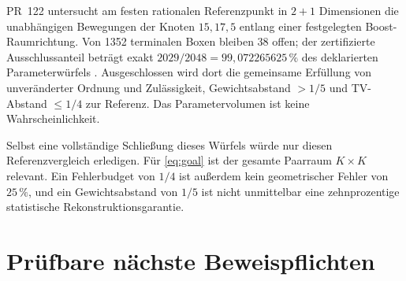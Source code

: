 \documentclass[11pt,a4paper]{article}
\theoremstyle{definition}\newtheorem{definition}{Definition}
\theoremstyle{remark}\newtheorem*{remark}{Bemerkung}
\begin{document}
PR~122 untersucht am festen rationalen Referenzpunkt in $2+1$ Dimensionen die unabhängigen Bewegungen der Knoten $15,17,5$ entlang einer festgelegten Boost-Raumrichtung. Von 1352 terminalen Boxen bleiben 38 offen; der zertifizierte Ausschlussanteil beträgt exakt $2029/2048=99{,}072265625\,\%$ des deklarierten Parameterwürfels \cite{repo122}. Ausgeschlossen wird dort die gemeinsame Erfüllung von unveränderter Ordnung und Zulässigkeit, Gewichtsabstand $>1/5$ und TV-Abstand $\leq1/4$ zur Referenz. Das Parametervolumen ist keine Wahrscheinlichkeit.

Selbst eine vollständige Schließung dieses Würfels würde nur diesen Referenzvergleich erledigen. Für \eqref{eq:goal} ist der gesamte Paarraum $K\times K$ relevant. Ein Fehlerbudget von $1/4$ ist außerdem kein geometrischer Fehler von $25\,\%$, und ein Gewichtsabstand von $1/5$ ist nicht unmittelbar eine zehnprozentige statistische Rekonstruktionsgarantie.

\section{Prüfbare nächste Beweispflichten}
\end{document}

